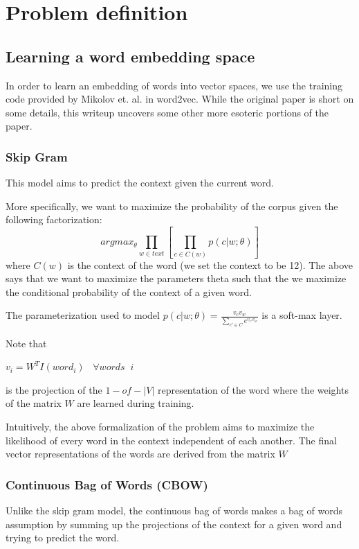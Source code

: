 
\section{Problem definition}

\subsection{Learning a word embedding space}

In order to learn an embedding of words into vector spaces, we use the training code provided by Mikolov et. al. in word2vec\cite{word2vec}. While the original paper is short on some details, this writeup\cite{word2vec_explained} uncovers some other more esoteric portions of the paper.

\subsubsection{Skip Gram}
This model aims to predict the context given the current word. 

More specifically, we want to maximize the probability of the corpus given the following factorization:
\begin{equation}
	argmax_{\theta} \prod_{w\in text} [\prod_{c\in C(w)} p(c|w;\theta)]
\end{equation}
where $C(w)$ is the context of the word (we set the context to be 12). The above says that we want to maximize the parameters theta such that the we maximize the conditional probability of the context of a given word. 

The parameterization used to model $p(c|w;\theta) = \frac{v_{c}v_w}{\sum_{c'\in C }e^{v_{c'}v_w}}$ is a soft-max layer. 


Note that 

$v_i = W^T I(word_i) \;\;\; \forall words \;\; i$ 


is the projection of the $1-of-|V|$ representation of the word where the weights of the matrix $W$ are learned during training. 

Intuitively, the above formalization of the problem aims to maximize the likelihood of every word in the context independent of each another. The final vector representations of the words are derived from the matrix $W$



\subsubsection{Continuous Bag of Words (CBOW)}
Unlike the skip gram model, the continuous bag of words makes a bag of words assumption by summing up the projections of the context for a given word and trying to predict the word. 

